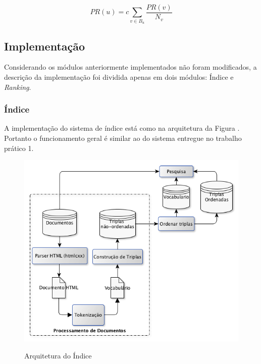 \documentclass[a4paper]{article}
\begin{document}
\begin{equation}
    PR(u) = c \sum_{v \in B_u}\frac{PR(v)}{N_v}
    \label{eq:eqpagerank}
\end{equation}


\subsection{Implementação}\label{sec:implementacao}

Considerando os módulos anteriormente implementados não foram modificados, 
a descrição da implementação foi dividida apenas em dois módulos: 
Índice e \emph{Ranking}. 

\subsubsection{Índice}




A implementação do sistema de índice está como na arquitetura 
da Figura . Portanto o funcionamento geral é similar ao do 
sistema entregue no trabalho prático 1. 

\begin{figure}[H]
    \centering
    \includegraphics[scale=0.5]{arquiteturaindex.png}
    \label{pic:arquiteturaindice}
    \caption{Arquitetura do Índice}
\end{figure}
\end{document}
